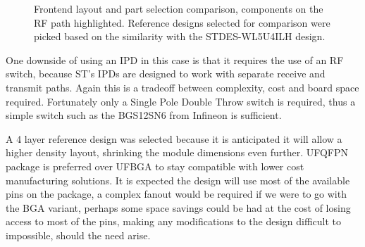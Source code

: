 \begin{figure}
    \centering
    \hfill
    \hfill
    \caption{\label{fig:frontend-comparison} Frontend layout and part selection comparison, components on the RF path highlighted. Reference designs selected for comparison were picked based on the similarity with the STDES-WL5U4ILH design.}
\end{figure}

One downside of using an IPD in this case is that it requires the use of an RF switch, because ST's IPDs are designed to work with separate receive and transmit paths. Again this is a tradeoff between complexity, cost and board space required. Fortunately only a Single Pole Double Throw switch is required, thus a simple switch such as the BGS12SN6 from Infineon is sufficient.

A 4 layer reference design was selected because it is anticipated it will allow a higher density layout, shrinking the module dimensions even further. UFQFPN package is preferred over UFBGA to stay compatible with lower cost manufacturing solutions. It is expected the design will use most of the available pins on the package, a complex fanout would be required if we were to go with the BGA variant, perhaps some space savings could be had at the cost of losing access to most of the pins, making any modifications to the design difficult to impossible, should the need arise.

